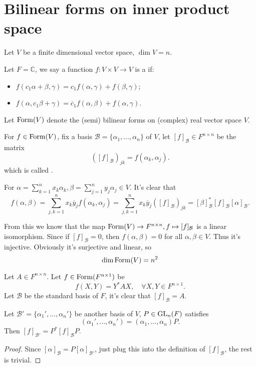\section{Bilinear forms on inner product space}
\label{sec:Bilinear forms on inner product space}
Let $V$ be a finite dimensional vector space, $\dim V = n$.
\begin{definition}
	Let $F = \mathbb{C}$, we say a function $f: V\times V \to V$ is
	a  if:
	\begin{itemize}
		\item $f(c_1\alpha + \beta, \gamma) = c_1f(\alpha, \gamma) + f(\beta, \gamma)$;
		\item $f(\alpha, c_1\beta + \gamma) = \overline{c}_1f(\alpha, \beta)+f(\alpha, \gamma)$.
	\end{itemize}

	Let $\operatorname{Form}(V)$ denote the (semi) bilinear forms on (complex) real vector space $V$.
\end{definition}

For $f \in \operatorname{Form}(V)$, fix a basis $\mathcal{B} = \{\alpha_1,\dots, \alpha_n\}$ of $V$,
let $[f]_{\mathcal{B}}\in F^{n\times n}$ be the matrix
\[
	([f]_{\mathcal{B}})_{jk} = f(\alpha_k, \alpha_j).
\]
which is called .

For $\alpha = \sum_{k=1}^{n} x_k\alpha_k, \beta = \sum_{j=1}^{n} y_j\alpha_j\in V$.
It's clear that
\[
f(\alpha, \beta) = \sum_{j, k = 1}^{n} x_k \overline{y}_j f(\alpha_k, \alpha_j)
= \sum_{j, k = 1}^{n} x_k \overline{y}_j ([f]_{\mathcal{B}})_{jk}
= [\beta]_{\mathcal{B}}^* [f]_{\mathcal{B}} [\alpha]_{\mathcal{B}}.
\]

From this we know that the map $\operatorname{Form}(V) \to F^{n\times n}, f\mapsto [f]_{\mathcal{B}}$
is a linear isomorphism.
Since if $[f]_{\mathcal{B}} = 0$, then $f(\alpha, \beta) = 0$ for all $\alpha, \beta\in V$.
Thus it's injective. Obviously it's surjective and linear,
so
\[
	\dim \operatorname{Form}(V) = n^2
\]

\begin{example}
    Let $A\in F^{n\times n}$. Let $f\in \operatorname{Form}(F^{n\times 1})$ be
	\[
	f(X, Y) = Y^*AX, \quad \forall X, Y\in F^{n\times 1}.
	\]
	Let $\mathcal{B}$ be the standard basis of $F$,
	it's clear that $[f]_{\mathcal{B}} = A$.
\end{example}
\begin{proposition}
	Let $\mathcal{B}' = \{\alpha_1', \dots, \alpha_n'\}$ be another basis of $V$,
	$P\in \mathrm{GL}_n(F)$ satisfies
	\[
		(\alpha_1',\dots, \alpha_n') = (\alpha_1, \dots, \alpha_n) P.
	\]
	Then $[f]_{\mathcal{B}'} = P^*[f]_{\mathcal{B}}P$.
\end{proposition}
\begin{proof}[Proof]
	Since $[\alpha]_{\mathcal{B}} = P[\alpha]_{\mathcal{B}'}$,
	just plug this into the definition of $[f]_{\mathcal{B}}$, the rest is trivial.
\end{proof}

